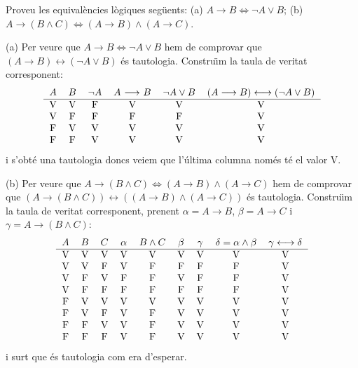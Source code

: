 \begin{exer}
Proveu les equival\`{e}ncies l\`{o}giques seg\"{u}ents: (a) $A\longrightarrow
B\Longleftrightarrow\lnot A\vee B$; (b) $A\longrightarrow\left(  B\wedge
C\right)  \Longleftrightarrow\left(  A\longrightarrow B\right)  \wedge\left(
A\longrightarrow C\right)  $.
\end{exer}

\begin{solucio}
(a) Per veure que $A\longrightarrow B\Longleftrightarrow\lnot A\vee B$ hem de
comprovar que $(A\longrightarrow B)\longleftrightarrow\left(  \lnot A\vee
B\right)  $ \'{e}s tautologia. Constru\"{\i}m la taula de veritat
corresponent:%
\[%
\begin{tabular}
[c]{cccccc}%
$A$ & $B$ & $\lnot A$ & $A$ $\longrightarrow$ $B$ & $\lnot A\vee B$ &
$(A\longrightarrow B)\longleftrightarrow\left(  \lnot A\vee B\right)
$\\\hline
V & V & F & V & V & V\\
V & F & F & F & F & V\\
F & V & V & V & V & V\\
F & F & V & V & V & V
\end{tabular}
\]
i s'obt\'{e} una tautologia doncs veiem que l'\'{u}ltima columna nom\'{e}s
t\'{e} el valor V.

(b) Per veure que $A\longrightarrow\left(  B\wedge C\right)
\Longleftrightarrow\left(  A\longrightarrow B\right)  \wedge\left(
A\longrightarrow C\right)  $ hem de comprovar que $(A\longrightarrow\left(
B\wedge C\right)  )\longleftrightarrow\left(  \left(  A\longrightarrow
B\right)  \wedge\left(  A\longrightarrow C\right)  \right)  $ \'{e}s
tautologia. Constru\"{\i}m la taula de veritat corresponent, prenent
$\alpha=A\longrightarrow B$, $\beta=A\longrightarrow C$ i $\gamma
=A\longrightarrow\left(  B\wedge C\right)  $:
\[%
\begin{tabular}
[c]{ccccccccc}%
$A$ & $B$ & $C$ & $\alpha$ & $B\wedge C$ & $\beta$ & $\gamma$ & $\delta
=\alpha\wedge\beta$ & $\gamma\longleftrightarrow\delta$\\\hline
V & V & V & V & V & V & V & V & V\\
V & V & F & V & F & F & F & F & V\\
V & F & V & F & F & V & F & F & V\\
V & F & F & F & F & F & F & F & V\\
F & V & V & V & V & V & V & V & V\\
F & V & F & V & F & V & V & V & V\\
F & F & V & V & F & V & V & V & V\\
F & F & F & V & F & V & V & V & V
\end{tabular}
\]
i surt que \'{e}s tautologia com era d'esperar.
\end{solucio}

